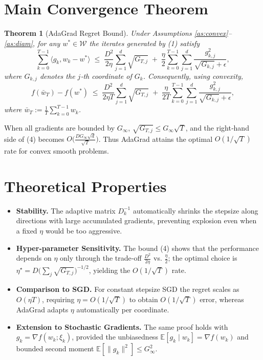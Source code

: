 \documentclass{article}
\newtheorem{theorem}{Theorem}
\newcommand{\EE}{\mathbb{E}}
\newcommand{\inner}[2]{\langle #1,#2\rangle}
\begin{document}
\section*{Main Convergence Theorem}
\begin{theorem}[AdaGrad Regret Bound]\label{thm:regret}
Under Assumptions \ref{as:convex}–\ref{as:diam}, for any $w^{*}\in\mathcal{W}$ the iterates generated by (1) satisfy
\[
\sum_{k=0}^{T-1}\inner{g_{k}}{w_{k}-w^{*}}
\;\le\;
\frac{D^{2}}{2\eta}\sum_{j=1}^{d}\sqrt{G_{T,j}}
\;+\;
\frac{\eta}{2}\sum_{k=0}^{T-1}\sum_{j=1}^{d}\frac{g_{k,j}^{2}}{\sqrt{G_{k,j}}+\epsilon},
\tag{3}
\]
where $G_{k,j}$ denotes the $j$‑th coordinate of $G_{k}$. Consequently, using convexity,
\[
f(\bar w_{T})-f(w^{*})\;\le\;
\frac{D^{2}}{2\eta T}\sum_{j=1}^{d}\sqrt{G_{T,j}}
\;+\;
\frac{\eta}{2T}\sum_{k=0}^{T-1}\sum_{j=1}^{d}\frac{g_{k,j}^{2}}{\sqrt{G_{k,j}}+\epsilon},
\tag{4}
\]
where $\bar w_{T}:=\frac1T\sum_{k=0}^{T-1}w_{k}$.
\end{theorem}
When all gradients are bounded by $G_{\infty}$, $\sqrt{G_{T,j}}\le G_{\infty}\sqrt{T}$, and the right‑hand side of (4) becomes $O\!\bigl(\frac{DG_{\infty}\sqrt{d}}{\sqrt{T}}\bigr)$. Thus AdaGrad attains the optimal $O(1/\sqrt{T})$ rate for convex smooth problems.

\section*{Theoretical Properties}
\begin{itemize}
\item \textbf{Stability.} The adaptive matrix $D_{k}^{-1}$ automatically shrinks the stepsize along directions with large accumulated gradients, preventing explosion even when a fixed $\eta$ would be too aggressive.
\item \textbf{Hyper‑parameter Sensitivity.} The bound (4) shows that the performance depends on $\eta$ only through the trade‑off $\frac{D^{2}}{2\eta}$ vs. $\frac{\eta}{2}$; the optimal choice is $\eta^{\star}=D\bigl(\sum_{j}\sqrt{G_{T,j}}\bigr)^{-1/2}$, yielding the $O(1/\sqrt{T})$ rate.
\item \textbf{Comparison to SGD.} For constant stepsize SGD the regret scales as $O(\eta T)$, requiring $\eta=O(1/\sqrt{T})$ to obtain $O(1/\sqrt{T})$ error, whereas AdaGrad adapts $\eta$ automatically per coordinate.
\item \textbf{Extension to Stochastic Gradients.} The same proof holds with $g_{k}=\nabla f(w_{k};\xi_{k})$, provided the unbiasedness $\EE[g_{k}\mid w_{k}]=\nabla f(w_{k})$ and bounded second moment $\EE[\|g_{k}\|^{2}]\le G_{\infty}^{2}$.
\end{itemize}
\end{document}
